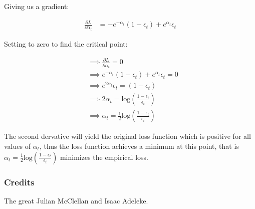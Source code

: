 \documentclass[a4paper,12pt]{article}
\begin{document}
Giving us a gradient: 

$$
\begin{aligned}
	\frac{\partial L}{\partial \alpha_t} &= -e^{-\alpha_{t}}(1 - \epsilon_{t}) + e^{\alpha_{t}}\epsilon_{t} 
\end{aligned} 
$$

Setting to zero to find the critical point: 

$$
\begin{aligned}
	&\implies \frac{\partial L}{\partial \alpha_t} = 0 \\
	&\implies e^{-\alpha_{t}}(1 - \epsilon_{t}) + e^{\alpha_{t}}\epsilon_{t} = 0 \\ 
	&\implies e^{2\alpha_{t}}\epsilon_{t} = (1 - \epsilon_{t}) \\
	&\implies 2\alpha_t = \textrm{log}(\frac{1 - \epsilon_t}{\epsilon_t}) \\
	&\implies \alpha_t = \frac{1}{2} \textrm{log}(\frac{1 - \epsilon_t}{\epsilon_t})
\end{aligned} 
$$

The second dervative will yield the original loss function which is positive for all values of $\alpha_t$, thus the loss function achieves a minimum at this point, that is $\alpha_t = \frac{1}{2} \textrm{log}(\frac{1 - \epsilon_t}{\epsilon_t})$ minimizes the empirical loss. 

\subsubsection{Credits} 

The great Julian McClellan and Isaac Adeleke. 
\end{document}
